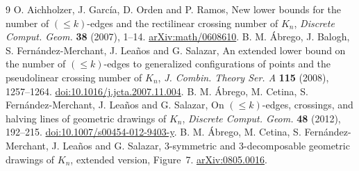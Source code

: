 \documentclass[11pt]{article}
\begin{document}
\begin{thebibliography}{9}
O. Aichholzer, J. García, D. Orden and P. Ramos,
New lower bounds for the number of \((\le k)\)-edges and the rectilinear crossing number of \(K_n\),
\emph{Discrete Comput. Geom.} \textbf{38} (2007), 1--14.
\href{https://arxiv.org/abs/math/0608610}{arXiv:math/0608610}.
B. M. Ábrego, J. Balogh, S. Fernández-Merchant, J. Leaños and G. Salazar,
An extended lower bound on the number of \((\le k)\)-edges to generalized configurations of points and the pseudolinear crossing number of \(K_n\),
\emph{J. Combin. Theory Ser. A} \textbf{115} (2008), 1257--1264.
\href{https://doi.org/10.1016/j.jcta.2007.11.004}{doi:10.1016/j.jcta.2007.11.004}.
B. M. Ábrego, M. Cetina, S. Fernández-Merchant, J. Leaños and G. Salazar,
On \((\le k)\)-edges, crossings, and halving lines of geometric drawings of \(K_n\),
\emph{Discrete Comput. Geom.} \textbf{48} (2012), 192--215.
\href{https://doi.org/10.1007/s00454-012-9403-y}{doi:10.1007/s00454-012-9403-y}.
B. M. Ábrego, M. Cetina, S. Fernández-Merchant, J. Leaños and G. Salazar,
3-symmetric and 3-decomposable geometric drawings of \(K_n\),
extended version, Figure~7.
\href{https://arxiv.org/abs/0805.0016}{arXiv:0805.0016}.
\end{thebibliography}
\end{document}

